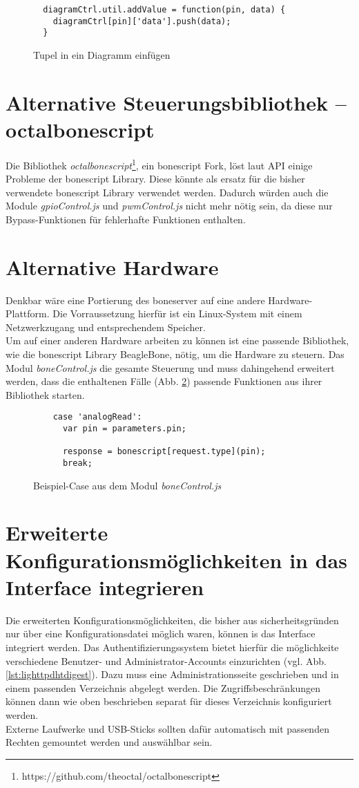 \begin{figure}[H]
  \begin{lstlisting}
  diagramCtrl.util.addValue = function(pin, data) {
    diagramCtrl[pin]['data'].push(data);
  }
  \end{lstlisting}
  \caption{Tupel in ein Diagramm einfügen}
  \label{lst:insertTupel}
\end{figure}


\section{Alternative Steuerungsbibliothek -- octalbonescript}
Die Bibliothek \textit{octalbonescript}\footnote{https://github.com/theoctal/octalbonescript}, ein bonescript Fork, löst laut API einige Probleme der bonescript Library. Diese könnte als ersatz für die bisher verwendete bonescript Library verwendet werden. Dadurch würden auch die Module \textit{gpioControl.js} und \textit{pwmControl.js} nicht mehr nötig sein, da diese nur Bypass-Funktionen für fehlerhafte Funktionen enthalten.


\section{Alternative Hardware}
Denkbar wäre eine Portierung des boneserver auf eine andere Hardware-Plattform. Die Vorraussetzung hierfür ist ein Linux-System mit einem Netzwerkzugang und entsprechendem Speicher.\\

Um auf einer anderen Hardware arbeiten zu können ist eine passende Bibliothek, wie die bonescript Library BeagleBone, nötig, um die Hardware zu steuern. Das Modul \textit{boneControl.js} die gesamte Steuerung und muss dahingehend erweitert werden, dass die enthaltenen Fälle (Abb. \ref{lst:exampleCase}) passende Funktionen aus ihrer Bibliothek starten.

\begin{figure}[H]
  \begin{lstlisting}
    case 'analogRead':
      var pin = parameters.pin;

      response = bonescript[request.type](pin);
      break;
  \end{lstlisting}
  \caption{Beispiel-Case aus dem Modul \textit{boneControl.js}}
  \label{lst:exampleCase}
\end{figure}


\section{Erweiterte Konfigurationsmöglichkeiten in das Interface integrieren}
Die erweiterten Konfigurationsmöglichkeiten, die bisher aus sicherheitsgründen nur über eine Konfigurationsdatei möglich waren, können is das Interface integriert werden. Das Authentifizierungssystem bietet hierfür die möglichkeite verschiedene Benutzer- und Administrator-Accounts einzurichten (vgl. Abb. \ref{lst:lighttpdhtdigest}). Dazu muss eine Administrationsseite geschrieben und in einem passenden Verzeichnis abgelegt werden. Die Zugriffsbeschränkungen können dann wie oben beschrieben separat für dieses Verzeichnis konfiguriert werden.\\

Externe Laufwerke und USB-Sticks sollten dafür automatisch mit passenden Rechten gemountet werden und auswählbar sein.